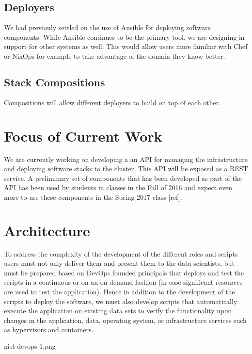 \documentclass[9pt,twocolumn,twoside]{styles/osajnl}
\begin{document}
\subsection{Deployers}

We had previouly settled on the use of Ansible for deploying software components. While Ansible continues to be the primary tool, we are designing in support for other systems as well. This would allow users more familiar with Chef or NixOps for example to take advantage of the domain they know better.



\subsection{Stack Compositions}

Compositions will allow different deployers to build on top of each other.




\section{Focus of Current Work}

We are currently working on developing a an API for managing the infrastructure and deploying software stacks to the cluster. This API will be exposed as a REST service. A preliminary set of components that has been developed as part of the API has been used by students in classes in the Fall of 2016 and expect even more to use these components in the Spring 2017 class [ref].
\section{Architecture}

To address the complexity of the development of the different roles and scripts users must not only deliver them and present them to the data scientists, but must be prepared based on DevOps founded principals that deploys and test the scripts in a continuous or on an on demand fashion (in case significant resources are used to test the application). Hence in addition to the development of the scripts to deploy the software, we must also develop scripts that automatically execute the application on existing data sets to verify the functionality upon changes in the application, data, operating system, or infrastructure services such as hypervisors and containers.




 nist-devops-1.png 
\end{document}

